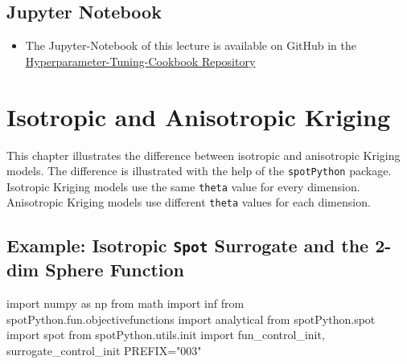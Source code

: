 \documentclass[
  letterpaper,
  DIV=11,
  numbers=noendperiod]{scrreprt}
\newenvironment{Shaded}{\begin{snugshade}}{\end{snugshade}}
\newcommand{\ImportTok}[1]{\textcolor[rgb]{0.00,0.46,0.62}{#1}}
\newcommand{\NormalTok}[1]{\textcolor[rgb]{0.00,0.23,0.31}{#1}}
\newcommand{\OperatorTok}[1]{\textcolor[rgb]{0.37,0.37,0.37}{#1}}
\newcommand{\StringTok}[1]{\textcolor[rgb]{0.13,0.47,0.30}{#1}}
\providecommand{\tightlist}{%
  \setlength{\itemsep}{0pt}\setlength{\parskip}{0pt}}\usepackage{longtable,booktabs,array}
\begin{document}
\section{Jupyter Notebook}\label{jupyter-notebook-7}

\begin{tcolorbox}[enhanced jigsaw, left=2mm, opacitybacktitle=0.6, leftrule=.75mm, toptitle=1mm, opacityback=0, colback=white, rightrule=.15mm, colframe=quarto-callout-note-color-frame, title=\textcolor{quarto-callout-note-color}{\faInfo}\hspace{0.5em}{Note}, toprule=.15mm, coltitle=black, bottomrule=.15mm, bottomtitle=1mm, colbacktitle=quarto-callout-note-color!10!white, titlerule=0mm, breakable, arc=.35mm]

\begin{itemize}
\tightlist
\item
  The Jupyter-Notebook of this lecture is available on GitHub in the
  \href{https://github.com/sequential-parameter-optimization/Hyperparameter-Tuning-Cookbook/blob/main/008_num_spot_multidim.ipynb}{Hyperparameter-Tuning-Cookbook
  Repository}
\end{itemize}

\end{tcolorbox}

\chapter{Isotropic and Anisotropic Kriging}\label{sec-iso-aniso-kriging}

This chapter illustrates the difference between isotropic and
anisotropic Kriging models. The difference is illustrated with the help
of the \texttt{spotPython} package. Isotropic Kriging models use the
same \texttt{theta} value for every dimension. Anisotropic Kriging
models use different \texttt{theta} values for each dimension.

\section{\texorpdfstring{Example: Isotropic \texttt{Spot} Surrogate and
the 2-dim Sphere
Function}{Example: Isotropic Spot Surrogate and the 2-dim Sphere Function}}\label{example-isotropic-spot-surrogate-and-the-2-dim-sphere-function}

\begin{Shaded}
\begin{Highlighting}[]
\ImportTok{import}\NormalTok{ numpy }\ImportTok{as}\NormalTok{ np}
\ImportTok{from}\NormalTok{ math }\ImportTok{import}\NormalTok{ inf}
\ImportTok{from}\NormalTok{ spotPython.fun.objectivefunctions }\ImportTok{import}\NormalTok{ analytical}
\ImportTok{from}\NormalTok{ spotPython.spot }\ImportTok{import}\NormalTok{ spot}
\ImportTok{from}\NormalTok{ spotPython.utils.init }\ImportTok{import}\NormalTok{ fun\_control\_init, surrogate\_control\_init}
\NormalTok{PREFIX}\OperatorTok{=}\StringTok{"003"}
\end{Highlighting}
\end{Shaded}
\end{document}
